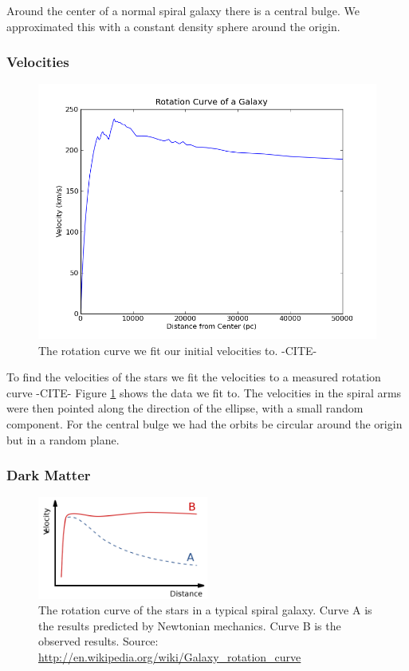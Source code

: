 \documentclass{report}
\begin{document}
Around the center of a normal spiral galaxy there is a central bulge. We approximated this with a constant density sphere around the origin. 

\subsubsection{Velocities}
\begin{figure}
\centering
\includegraphics[width=.8\columnwidth]{rotation_curve.png}
\caption{The rotation curve we fit our initial velocities to. -CITE- } 
\label{fig:vel}
\end{figure}
To find the velocities of the stars we fit the velocities to a measured rotation curve -CITE- Figure \ref{fig:vel} shows the data we fit to. The velocities in the spiral arms were then pointed along the direction of the ellipse, with a small random component. For the central bulge we had the orbits be circular around the origin but in a random plane. 
\subsubsection{Dark Matter}
\begin{figure}[H]
 \centering
 \includegraphics[width=0.5\textwidth]{./rotation.png}
  \caption{The rotation curve of the stars in a typical spiral galaxy. Curve A is the results predicted by
 Newtonian mechanics. Curve B is the observed results. Source:  \url{http://en.wikipedia.org/wiki/Galaxy_rotation_curve} } 
 \label{fig:rot}
\end{figure}
\end{document}
